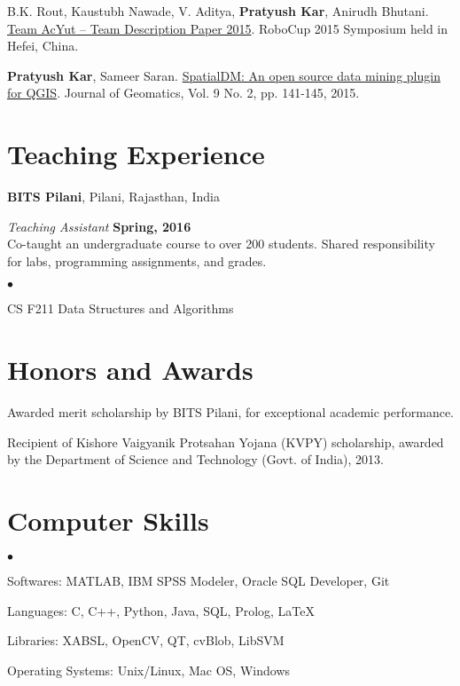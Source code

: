 \documentclass[margin,line]{res}
\newenvironment{list2}{
  \begin{list}{$\bullet$}{%
      \setlength{\itemsep}{0in}
      \setlength{\parsep}{0in} \setlength{\parskip}{0in}
      \setlength{\topsep}{0in} \setlength{\partopsep}{0in} 
      \setlength{\leftmargin}{0.2in}}}{\end{list}}
\begin{document}
\begin{resume}
B.K. Rout, Kaustubh Nawade, V. Aditya, {\bf Pratyush Kar}, Anirudh Bhutani. \href{https://sites.google.com/site/pratyushkar/publications/Team\%20AcYut\%20\%E2\%80\%93\%20Team\%20Description\%20Paper\%202015.pdf?attredirects=0&d=0}{Team AcYut -- Team Description Paper 2015}. RoboCup 2015 Symposium held in Hefei, China.

{\bf Pratyush Kar}, Sameer Saran. \href{https://sites.google.com/site/pratyushkar/publications/SpatialDM.pdf?attredirects=0&d=0}{SpatialDM: An open source data mining plugin for QGIS}. Journal of Geomatics, Vol. 9 No. 2, pp. 141-145, 2015.

\section{\sc Teaching Experience}
{\bf BITS Pilani}, Pilani, Rajasthan, India

\vspace{-.3cm}
{\em Teaching Assistant} \hfill {\bf Spring, 2016}\\
Co-taught an undergraduate course to over 200 students.  Shared responsibility for labs, programming assignments, and grades.
\vspace*{.05in}  
\begin{list2}
\item CS F211 Data Structures and Algorithms
\end{list2}


\section{\sc Honors and Awards}

Awarded merit scholarship by BITS Pilani, for exceptional academic performance.

\vspace*{-2.5mm}
Recipient of Kishore Vaigyanik Protsahan Yojana (KVPY) scholarship, awarded by the Department of Science and Technology (Govt. of India), 2013.


\section{\sc Computer Skills} 
\begin{list2}
\item Softwares: MATLAB, IBM SPSS Modeler, Oracle SQL Developer, Git
\item Languages:  C, C++, Python, Java, SQL, Prolog, \LaTeX
\item Libraries: XABSL, OpenCV, QT, cvBlob, LibSVM
\item Operating Systems:  Unix/Linux, Mac OS, Windows\\ 
\end{list2}



\end{resume}
\end{document}
